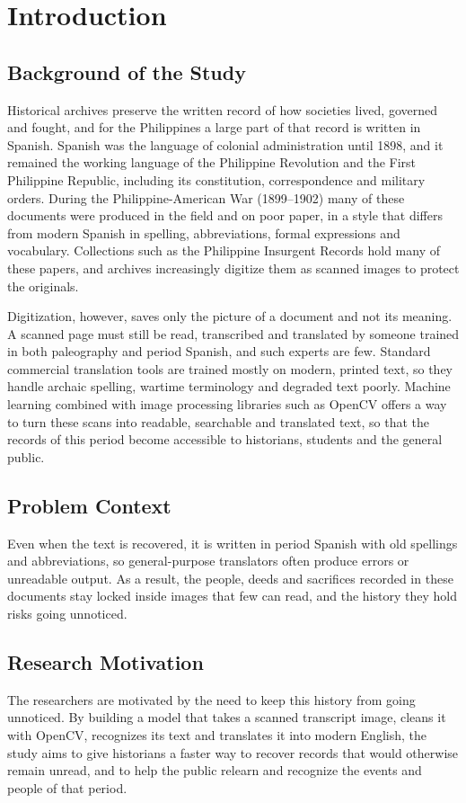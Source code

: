\documentclass[10pt,twocolumn]{article}
\begin{document}
\section{Introduction}
\subsection{Background of the Study}
Historical archives preserve the written record of how societies lived, governed and fought, and for the Philippines a large part of that record is written in Spanish. Spanish was the language of colonial administration until 1898, and it remained the working language of the Philippine Revolution and the First Philippine Republic, including its constitution, correspondence and military orders. During the Philippine-American War (1899--1902) many of these documents were produced in the field and on poor paper, in a style that differs from modern Spanish in spelling, abbreviations, formal expressions and vocabulary. Collections such as the Philippine Insurgent Records hold many of these papers, and archives increasingly digitize them as scanned images to protect the originals.

Digitization, however, saves only the picture of a document and not its meaning. A scanned page must still be read, transcribed and translated by someone trained in both paleography and period Spanish, and such experts are few. Standard commercial translation tools are trained mostly on modern, printed text, so they handle archaic spelling, wartime terminology and degraded text poorly. Machine learning combined with image processing libraries such as OpenCV offers a way to turn these scans into readable, searchable and translated text, so that the records of this period become accessible to historians, students and the general public.

\subsection{Problem Context}
Even when the text is recovered, it is written in period Spanish with old spellings and abbreviations, so general-purpose translators often produce errors or unreadable output. As a result, the people, deeds and sacrifices recorded in these documents stay locked inside images that few can read, and the history they hold risks going unnoticed.

\subsection{Research Motivation}
The researchers are motivated by the need to keep this history from going unnoticed. By building a model that takes a scanned transcript image, cleans it with OpenCV, recognizes its text and translates it into modern English, the study aims to give historians a faster way to recover records that would otherwise remain unread, and to help the public relearn and recognize the events and people of that period.
\end{document}
